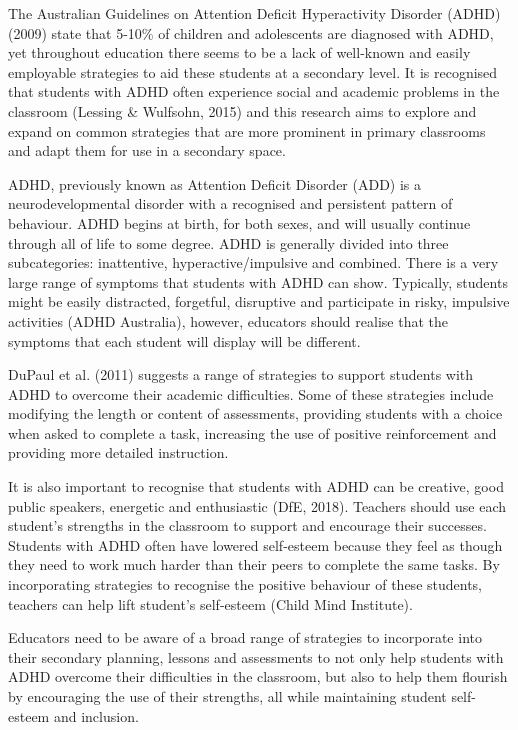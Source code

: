 \documentclass[twoside,12pt,a4paper,notitlepage]{memoir}
\begin{document}
The Australian Guidelines on Attention Deficit Hyperactivity Disorder (ADHD) (2009) state that 5-10\% of children and adolescents are diagnosed with ADHD, yet throughout education there seems to be a lack of well-known and easily employable strategies to aid these students at a secondary level. It is recognised that students with ADHD often experience social and academic problems in the classroom (Lessing \& Wulfsohn, 2015) and this research aims to explore and expand on common strategies that are more prominent in primary classrooms and adapt them for use in a secondary space.


ADHD, previously known as Attention Deficit Disorder (ADD) is a neurodevelopmental disorder with a recognised and persistent pattern of behaviour. ADHD begins at birth, for both sexes, and will usually continue through all of life to some degree. ADHD is generally divided into three subcategories: inattentive, hyperactive/impulsive and combined. There is a very large range of symptoms that students with ADHD can show. Typically, students might be easily distracted, forgetful, disruptive and participate in risky, impulsive activities (ADHD Australia), however, educators should realise that the symptoms that each student will display will be different.


DuPaul et al. (2011) suggests a range of strategies to support students with ADHD to overcome their academic difficulties. Some of these strategies include modifying the length or content of assessments, providing students with a choice when asked to complete a task, increasing the use of positive reinforcement and providing more detailed instruction.


It is also important to recognise that students with ADHD can be creative, good public speakers, energetic and enthusiastic (DfE, 2018). Teachers should use each student’s strengths in the classroom to support and encourage their successes. Students with ADHD often have lowered self-esteem because they feel as though they need to work much harder than their peers to complete the same tasks. By incorporating strategies to recognise the positive behaviour of these students, teachers can help lift student’s self-esteem (Child Mind Institute).


Educators need to be aware of a broad range of strategies to incorporate into their secondary planning, lessons and assessments to not only help students with ADHD overcome their difficulties in the classroom, but also to help them flourish by encouraging the use of their strengths, all while maintaining student self-esteem and inclusion.
\end{document}
